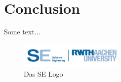 \chapter{Conclusion}
Some text...
\begin{figure}[ht!]
\begin{center}\includegraphics[width=5cm]{src/pic/logo}\end{center}
\caption{Das SE Logo}
\label{Logo}
\end{figure}

\cleardoublepage
